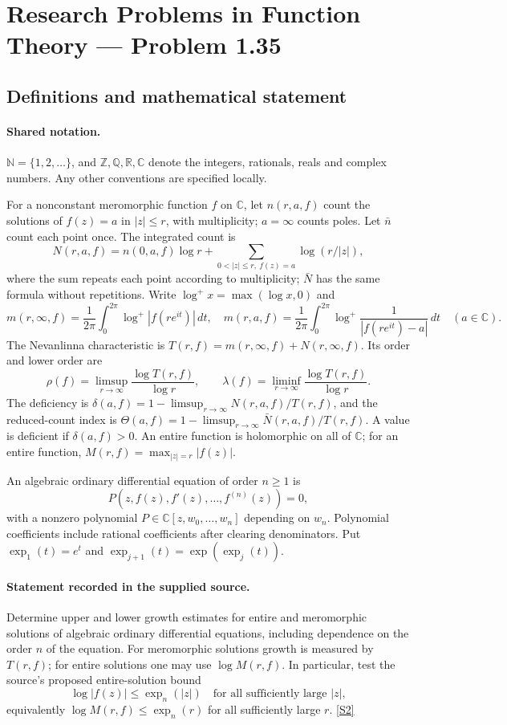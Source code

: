 \documentclass[11pt]{article}
\newcommand{\sref}[2]{\hyperlink{source:#1:#2}{[S#2]}}
\begin{document}
\section{Research Problems in Function Theory — Problem 1.35}\label{statement}

\subsection{Definitions and mathematical statement}

\paragraph{Shared notation.}$\mathbb N=\{1,2,\ldots\}$, and $\mathbb Z,\mathbb Q,\mathbb R,\mathbb C$ denote the integers, rationals, reals and complex numbers. Any other conventions are specified locally.


For a nonconstant meromorphic function $f$ on $\mathbb C$, let $n(r,a,f)$ count the solutions of $f(z)=a$ in $|z|\le r$, with multiplicity; $a=\infty$ counts poles. Let $\bar n$ count each point once. The integrated count is
\[
 N(r,a,f)=n(0,a,f)\log r+\sum_{0<|z|\le r,\ f(z)=a}\log(r/|z|),
\]
where the sum repeats each point according to multiplicity; $\bar N$ has the same formula without repetitions. Write $\log^+x=\max(\log x,0)$ and
\[
 m(r,\infty,f)=\frac1{2\pi}\int_0^{2\pi}\log^+|f(re^{it})|\,dt,\quad
 m(r,a,f)=\frac1{2\pi}\int_0^{2\pi}\log^+\frac1{|f(re^{it})-a|}\,dt\quad(a\in\mathbb C).
\]
The Nevanlinna characteristic is $T(r,f)=m(r,\infty,f)+N(r,\infty,f)$. Its order and lower order are
\[
 \rho(f)=\limsup_{r\to\infty}\frac{\log T(r,f)}{\log r},\qquad
 \lambda(f)=\liminf_{r\to\infty}\frac{\log T(r,f)}{\log r}.
\]
The deficiency is $\delta(a,f)=1-\limsup_{r\to\infty}N(r,a,f)/T(r,f)$, and the reduced-count index is $\Theta(a,f)=1-\limsup_{r\to\infty}\bar N(r,a,f)/T(r,f)$. A value is deficient if $\delta(a,f)>0$. An entire function is holomorphic on all of $\mathbb C$; for an entire function, $M(r,f)=\max_{|z|=r}|f(z)|$.

An algebraic ordinary differential equation of order $n\ge1$ is
\[
 P(z,f(z),f'(z),\ldots,f^{(n)}(z))=0,
\]
with a nonzero polynomial $P\in\mathbb C[z,w_0,\ldots,w_n]$ depending on $w_n$. Polynomial coefficients include rational coefficients after clearing denominators. Put $\exp_1(t)=e^t$ and $\exp_{j+1}(t)=\exp(\exp_j(t))$.
\paragraph{Statement recorded in the supplied source.}
Determine upper and lower growth estimates for entire and meromorphic solutions of algebraic ordinary differential equations, including dependence on the order $n$ of the equation. For meromorphic solutions growth is measured by $T(r,f)$; for entire solutions one may use $\log M(r,f)$. In particular, test the source's proposed entire-solution bound
\[
 \log|f(z)|\le\exp_n(|z|)\quad\text{for all sufficiently large }|z|,
\]
equivalently $\log M(r,f)\le\exp_n(r)$ for all sufficiently large $r$. \sref{statement}{2}
\end{document}
